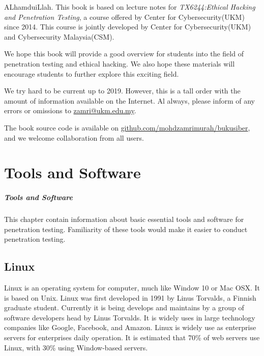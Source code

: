 \documentclass[7x9]{times}
\begin{document}
\begin{preface}
ALhamduiLlah. This book is based on lecture notes for \textit{TX6244:Ethical Hacking and Penetration Testing}, a course offered by Center for Cybersecurity(UKM) since 2014. This course is jointly developed by Center for Cybersecurity(UKM) and Cybersecurity Malaysia(CSM).

We hope this book will provide a good overview for students into the field of penetration testing and ethical hacking. We also hope these materials will encourage students to further explore this exciting field.

We try hard to be current up to 2019. However, this is a tall order with the amount of information available on the Internet. Al always, please inform of any errors or omissions to \url{zamri@ukm.edu.my}.

The book source code is available on \url{github.com/mohdzamrimurah/bukusiber}, and we welcome collaboration from all users.



\end{preface}


\chapter{Tools and Software}


\paragraph{Tools and Software} This chapter contain
information about basic essential tools and software for
penetration testing. Familiarity of these tools would make
it easier to conduct penetration testing.


\section{Linux}

Linux\cite{sobell2015practical,barrett2016linux} is an
operating system for computer, much like Window 10 or Mac
OSX. It is based on Unix. Linux was first developed in 1991
by Linus Torvalds, a Finnish graduate student. Currently it
is being develops and maintains by a group of software
developers head by Linus Torvalds. It is widely uses in
large technology companies like Google, Facebook, and
Amazon. Linux is widely use as enterprise servers for
enterprises daily operation. It is estimated that 70\% of
web servers use Linux, with 30\% using Window-based servers.
\end{document}
